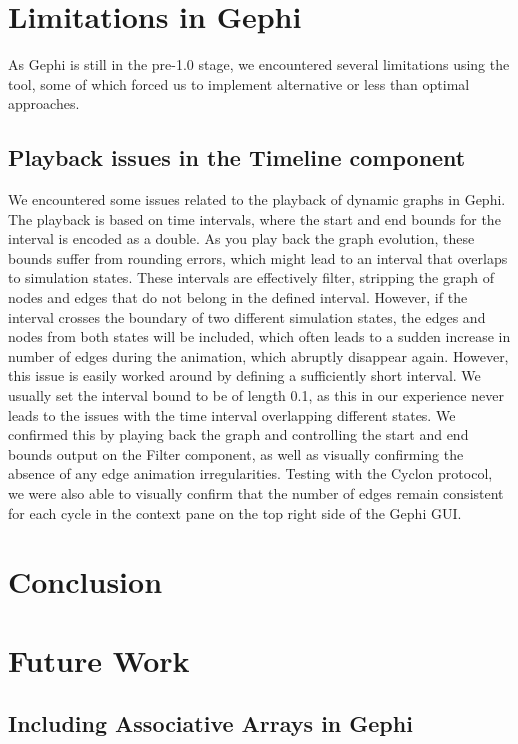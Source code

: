 \section{Limitations in Gephi}

As Gephi is still in the pre-1.0 stage, we encountered several
limitations using the tool, some of which forced us to implement
alternative or less than optimal approaches.


\subsection{Playback issues in the Timeline component}

We encountered some issues related to the playback of dynamic
graphs in Gephi. The playback is based on time intervals, where the
start and end bounds for the interval is encoded as a double. As you
play back the graph evolution, these bounds suffer from rounding errors,
which might lead to an interval that overlaps to simulation states.
These intervals are effectively filter, stripping the graph of nodes and
edges that do not belong in the defined interval. However, if the
interval crosses the boundary of two different simulation states, the
edges and nodes from both states will be included, which often leads to
a sudden increase in number of edges during the animation, which
abruptly disappear again. However, this issue is easily worked around by
defining a sufficiently short interval. We usually set the interval
bound to be of length 0.1, as this in our experience never leads to the
issues with the time interval overlapping different states. We confirmed
this by playing back the graph and controlling the start and end bounds
output on the Filter component, as well as visually confirming the
absence of any edge animation irregularities. Testing with the Cyclon
protocol, we were also able to visually confirm that the number of edges
remain consistent for each cycle in the context pane on the top right
side of the Gephi GUI\@.

\section{Conclusion}

\section{Future Work}

\subsection{Including Associative Arrays in Gephi}

